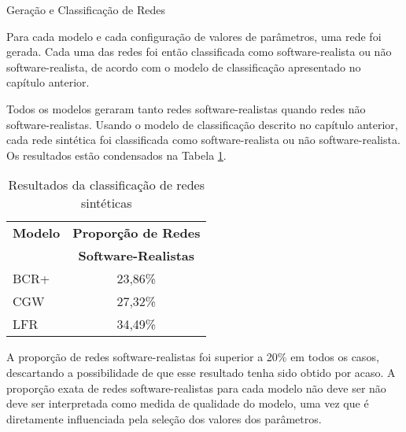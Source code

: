 \begin{section}{Geração e Classificação de Redes}
	
	Para cada modelo e cada configuração de valores de parâmetros, uma rede foi gerada. Cada uma das redes foi então classificada como software-realista ou não software-realista, de acordo com o modelo de classificação apresentado no capítulo anterior.

	Todos os modelos geraram tanto redes software-realistas quando redes não software-realistas.
Usando o modelo de classificação descrito no capítulo anterior, cada rede sintética foi classificada como software-realista ou não software-realista. Os resultados estão condensados na Tabela \ref{tab:results}.

\begin{table}
\caption{Resultados da classificação de redes sintéticas}
\centering
\begin{tabular}{|l|c|}
\hline
\textbf{Modelo} & \textbf{Proporção de Redes} \\ & \textbf{Software-Realistas} \\
\hline 
\hline

BCR+ & 23,86\% \\ %
\hline
CGW  & 27,32\% \\  %
\hline
LFR  & 34,49\% \\ %
\hline
\end{tabular}
\label{tab:results}
\end{table}

	A proporção de redes software-realistas foi superior a 20\% em todos os casos, descartando a possibilidade de que esse resultado tenha sido obtido por acaso. A proporção exata de redes software-realistas para cada modelo não deve ser não deve ser interpretada como medida de qualidade do modelo, uma vez que é diretamente influenciada pela seleção dos valores dos parâmetros.
	

\end{section}

